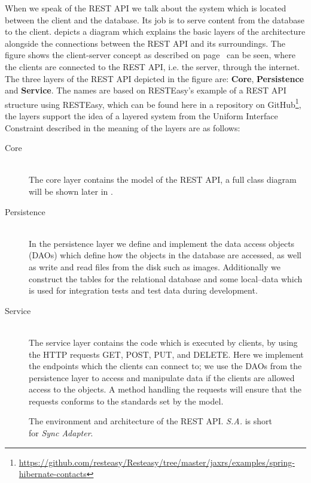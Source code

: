 When we speak of the REST API we talk about the system which is located between the client and the database.
Its job is to serve content from the database to the client.
 depicts a diagram which explains the basic layers of the architecture alongside the connections between the REST API and its surroundings.
The figure shows the client-server concept as described on page~\pageref{client-server-rest} can be seen, where the clients are connected to the REST API, i.e. the server, through the internet.
The three layers of the REST API depicted in the figure are: \textbf{Core}, \textbf{Persistence} and \textbf{Service}.
The names are based on RESTEasy's example of a REST API structure using RESTEasy, which can be found here in a repository on GitHub\footnote{\url{https://github.com/resteasy/Resteasy/tree/master/jaxrs/examples/spring-hibernate-contacts}}, the layers support the idea of a layered system from the Uniform Interface Constraint described in  the meaning of the layers are as follows:
\begin{description}
    \item[Core] \hfill \\
    The core layer contains the model of the REST API, a full class diagram will be shown later in .

    \item[Persistence] \hfill \\
    In the persistence layer we define and implement the data access objects (DAOs) which define how the objects in the database are accessed, as well as write and read files from the disk such as images.
    Additionally we construct the tables for the relational database and some local--data which is used for integration tests and test data during development.

    \item[Service] \hfill \\
    The service layer contains the code which is executed by clients, by using the HTTP requests GET, POST, PUT, and DELETE.
    Here we implement the endpoints which the clients can connect to; we use the DAOs from the persistence layer to access and manipulate data if the clients are allowed access to the objects.
    A method handling the requests will ensure that the requests conforms to the standards set by the model.
\end{description}

\begin{figure}[h]
    \centering
    
    \caption{The environment and architecture of the REST API. \textit{S.A.} is short for \textit{Sync Adapter}.}\label{fig:rest-architecture}
\end{figure}

